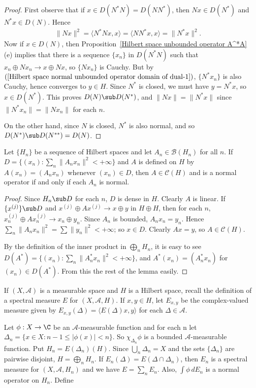 \begin{proof}
First observe that if $x\in D(N^*N)=D(NN^*)$, then $Nx\in D(N^*)$ and $N^*x\in D(N)$. Hence
\begin{align}\label{Hilbert space normal unbounded operator domain of dual-1}
\|Nx\|^2=\langle N^*Nx,x\rangle=\langle NN^*x,x\rangle=\|N^*x\|^2.
\end{align}
Now if $x\in D(N)$, then Proposition~\ref{Hilbert space unbounded operator A^*A}(e) implies that there is a sequence $\{x_n\}$ in $D(N^*N)$ such that $x_n\oplus Nx_n\to x\oplus Nx$, so $\{Nx_n\}$ is Cauchy. But by $(\ref{Hilbert space normal unbounded operator domain of dual-1})$, $\{N^*x_n\}$ is also Cauchy, hence converges to $y\in H$. Since $N^*$ is closed, we must have $y=N^*x$, so $x\in D(N^*)$. This proves $D(N)\sub D(N^*)$, and $\|Nx\|=\|N^*x\|$ since $\|N^*x_n\|=\|Nx_n\|$ for each $n$.\par
On the other hand, since $N$ is closed, $N^*$ is also normal, and so $D(N^*)\sub D(N^{**})=D(N)$.
\end{proof}
\begin{lemma}\label{Hilbert space unbounded sum of operator}
Let $\{H_n\}$ be a sequence of Hilbert spaces and let $A_n\in\mathcal{B}(H_n)$ for all $n$. If $D=\{(x_n):\sum_n\|A_nx_n\|^2<+\infty\}$ and $A$ is defined on $H$ by $A(x_n)=(A_nx_n)$ whenever $(x_n)\in D$, then $A\in\mathcal{C}(H)$ and is a normal operator if and only if each $A_n$ is normal.
\end{lemma}
\begin{proof}
Since $H_n\sub D$ for each $n$, $D$ is dense in $H$. Clearly $A$ is linear. If $\{x^{(j)}\}\sub D$ and $x^{(j)}\oplus Ax^{(j)}\to x\oplus y$ in $H\oplus H$, then for each $n$, $x_n^{(j)}\oplus Ax_n^{(j)}\to x_n\oplus y_n$. Since $A_n$ is bounded, $A_nx_n=y_n$. Hence $\sum_n\|A_nx_n\|^2=\sum\|y_n\|^2<+\infty$; so $x\in D$. Clearly $Ax=y$, so $A\in\mathcal{C}(H)$.\par
By the definition of the inner product in $\bigoplus_nH_n$, it is easy to see $D(A^*)=\{(x_n):\sum_n\|A_n^*x_n\|^2<+\infty\}$, and $A^*(x_n)=(A^*_nx_n)$ for $(x_n)\in D(A^*)$. From this the rest of the lemma easily.
\end{proof}
If $(X,\mathcal{A})$ is a measurable space and $H$ is a Hilbert space, recall the definition of a spectral measure $E$ for $(X,\mathcal{A},H)$. If $x,y\in H$, let $E_{x,y}$ be the complex-valued measure given by $E_{x,y}(\Delta)=\langle E(\Delta)x,y\rangle$ for each $\Delta\in\mathcal{A}$.\par
Let $\phi:X\to\C$ be an $\mathcal{A}$-measurable function and for each n let $\Delta_n=\{x\in X:n-1\leq|\phi(x)|<n\}$. So $\chi_{\Delta_n}\phi$ is a bounded $\mathcal{A}$-measurable function. Put $H_n=E(\Delta_n)(H)$. Since $\bigcup_n\Delta_n=X$ and the sets $\{\Delta_n\}$ are pairwise disjoint, $H=\bigoplus_nH_n$. If $E_n(\Delta)=E(\Delta\cap\Delta_n)$, then $E_n$ is a spectral measure for $(X,\mathcal{A},H_n)$ and we have $E=\sum_nE_n$. Also, $\int\phi\, dE_n$ is a normal operator on $H_n$. Define
